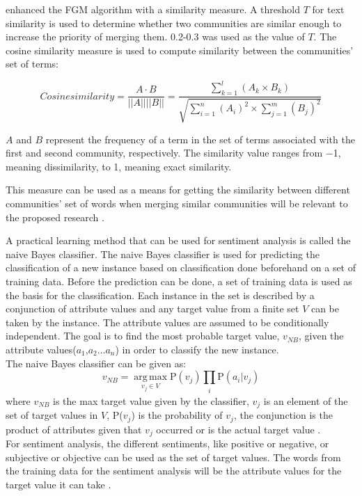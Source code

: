  enhanced the FGM algorithm with a similarity measure. A threshold $T$ for text similarity is used to determine whether two communities are similar enough to increase the priority of merging them. 0.2-0.3 was used as the value of $T$. The cosine similarity measure is used to compute similarity between the communities' set of terms:


\begin{equation}
	Cosine similarity = \frac {A \cdot B}{||A|| ||B||} = \frac {\sum_{k = 1}^{l}(A_k \times B_k)}{\sqrt{\sum_{i = 1}^{n} (A_i)^2 \times \sum_{j = 1}^{m} (B_j)^2}}
\end{equation}


$A$ and $B$ represent the frequency of a term in the set of terms associated with the first and second community, respectively. The similarity value ranges from −1, meaning dissimilarity, to 1, meaning exact similarity.


This measure can be used as a means for getting the similarity between different communities’ set of words when merging similar communities will be relevant to the proposed research \cite{Bakillah:2014}.


A practical learning method that can be used for sentiment analysis is called the naive Bayes classifier. The naive Bayes classifier is used for predicting the classification of a new instance based on classification done beforehand on a set of training data. Before the prediction can be done, a set of training data is used as the basis for the classification. Each instance in the set is described by a conjunction of attribute values and any target value from a finite set $V$ can be taken by the instance. The attribute values are assumed to be conditionally independent. The goal is to find the most probable target value, $v_{NB}$, given the attribute values($a_1$,$a_2$...$a_n$) in order to classify the new instance. \\ The naive Bayes classifier can be given as:
\begin{equation}
	v_{NB} = \operatorname*{arg\,max}_{v_j \in V} \text{P}(v_j) \prod_{\substack{i}} \text{P}(a_i|v_j)
\end{equation}
where $v_{NB}$ is the max target value given by the classifier, $v_j$ is an element of the set of target values in $V$, P($v_j$) is the probability of $v_j$, the conjunction is the product of attributes given that $v_j$ occurred or is the actual target value \cite{Mitchell:1997}. \\
For sentiment analysis, the different sentiments, like positive or negative, or subjective or objective can be used as the set of target values. The words from the training data for the sentiment analysis will be the attribute values for the target value it can take \cite{Deitrick:2013}.


